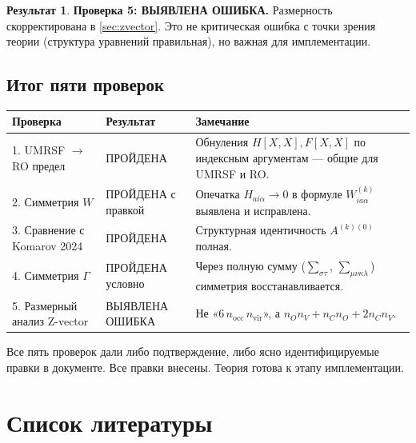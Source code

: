 \documentclass[11pt, a4paper]{article}
\theoremstyle{definition}
\newtheorem*{result}{Результат}
\newcommand{\nocc}{n_{\text{occ}}}
\newcommand{\nvir}{n_{\text{vir}}}
\begin{document}
\begin{result}
\textbf{Проверка 5: ВЫЯВЛЕНА ОШИБКА.} Размерность скорректирована в \cref{sec:zvector}. Это не критическая ошибка с точки зрения теории (структура уравнений правильная), но важная для имплементации.
\end{result}

\subsection{Итог пяти проверок}

\begin{center}
\begin{tabularx}{\textwidth}{lXX}
\toprule
Проверка & Результат & Замечание \\
\midrule
1. UMRSF $\to$ RO предел & ПРОЙДЕНА & Обнуления $H[X,X], F[X,X]$ по индексным аргументам --- общие для UMRSF и RO. \\
2. Симметрия $W$ & ПРОЙДЕНА с правкой & Опечатка $H_{ai\alpha} \to 0$ в формуле $W^{(k)}_{ia\alpha}$ выявлена и исправлена. \\
3. Сравнение с Komarov 2024 & ПРОЙДЕНА & Структурная идентичность $A^{(k)(0)}$ полная. \\
4. Симметрия $\Gamma$ & ПРОЙДЕНА условно & Через полную сумму ($\sum_{\sigma\tau}$, $\sum_{\mu\nu\kappa\lambda}$) симметрия восстанавливается. \\
5. Размерный анализ Z-vector & ВЫЯВЛЕНА ОШИБКА & Не «$6\, \nocc\, \nvir$», а $n_O n_V + n_C n_O + 2 n_C n_V$. \\
\bottomrule
\end{tabularx}
\end{center}

Все пять проверок дали либо подтверждение, либо ясно идентифицируемые правки в документе. Все правки внесены. Теория готова к этапу имплементации.

\section*{Список литературы}
\end{document}
